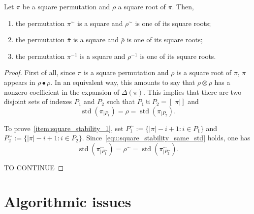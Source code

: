 \documentclass[a4paper,10pt]{llncs}
\DeclareMathOperator{\STD}{\mathrm{std}}
\begin{document}
\begin{proposition} \label{prop:square_stability}
    Let $\pi$ be a square permutation and $\rho$ a square root of $\pi$.
    Then,
    \begin{enumerate}[label={\it (\roman*)},fullwidth]
        \item \label{item:square_stability_1}
        the permutation $\pi^\sim$ is a square and $\rho^\sim$
        is one of its square roots;
        \item \label{item:square_stability_2}
        the permutation $\bar \pi$ is a square and $\bar \rho$
        is one of its square roots;
        \item \label{item:square_stability_3}
        the permutation $\pi^{-1}$ is a square and $\rho^{-1}$
        is one of its square roots.
    \end{enumerate}
\end{proposition}
\begin{proof}
    First of all, since $\pi$ is a square permutation and $\rho$ is a
    square root of $\pi$, $\pi$ appears in $\rho \bullet \rho$. In
    an equivalent way, this amounts to say that $\rho \otimes \rho$ has
    a nonzero coefficient in the expansion of $\Delta(\pi)$. This
    implies that there are two disjoint sets of indexes $P_1$ and $P_2$
    such that $P_1 \uplus P_2 = [|\pi|]$ and
    \begin{equation} \label{equ:square_stability_same_std}
        \STD\left(\pi_{|P_1}\right) = \rho = \STD\left(\pi_{|P_2}\right).
    \end{equation}
    \smallskip

    To prove~\ref{item:square_stability_1}, set
    $P_1^\sim := \{|\pi| - i  + 1 : i \in P_1\}$ and
    $P_2^\sim := \{|\pi| - i  + 1 : i \in P_2\}$.
    Since~\eqref{equ:square_stability_same_std} holds, one has
    \begin{equation}
        \STD\left(\pi^\sim_{|P_1^\sim}\right) = \rho^\sim =
        \STD\left(\pi^\sim_{|P_2^\sim}\right).
    \end{equation}

    TO CONTINUE

\end{proof}
\medskip


\section{Algorithmic issues}
\label{section:Algorithmic issues}
\end{document}
